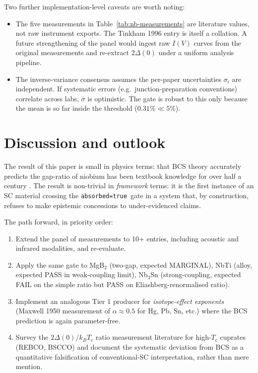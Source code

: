 \documentclass[11pt,a4paper]{article}
\newcommand{\absorbedtrue}{\textcolor{honestgreen}{\texttt{absorbed=true}}}
\begin{document}
Two further implementation-level caveats are worth noting:

\begin{itemize}\itemsep0.3em
\item The five measurements in Table~\ref{tab:nb-measurements} are
  literature values, not raw instrument exports. The Tinkham 1996
  entry is itself a collation. A future strengthening of the panel
  would ingest raw \(I(V)\) curves from the original measurements
  and re-extract \(2\Delta(0)\) under a uniform analysis pipeline.
\item The inverse-variance consensus assumes the per-paper
  uncertainties \(\sigma_{i}\) are independent. If systematic errors
  (e.g.\ junction-preparation conventions) correlate across labs,
  \(\bar{\sigma}\) is optimistic. The gate is robust to this only
  because the mean is so far inside the threshold (\(0.31\% \ll 5\%\)).
\end{itemize}

\section{Discussion and outlook}
\label{sec:discussion}

The result of this paper is small in physics terms: that BCS
theory accurately predicts the gap-ratio of niobium has been
textbook knowledge for over half a century \cite{tinkham1996}.
The result is non-trivial in \emph{framework} terms: it is the
first instance of an SC material crossing the \absorbedtrue\ gate in
a system that, by construction, refuses to make epistemic concessions
to under-evidenced claims.

The path forward, in priority order:

\begin{enumerate}\itemsep0.3em
\item Extend the panel of measurements to 10+ entries, including
  acoustic and infrared modalities, and re-evaluate.
\item Apply the same gate to MgB$_2$ (two-gap, expected MARGINAL),
  NbTi (alloy, expected PASS in weak-coupling limit), Nb$_{3}$Sn
  (strong-coupling, expected FAIL on the simple ratio but PASS on
  Eliashberg-renormalised ratio).
\item Implement an analogous Tier 1 producer for \emph{isotope-effect
  exponents} (Maxwell 1950 measurement of \(\alpha \approx 0.5\) for Hg, Pb,
  Sn, etc.) where the BCS prediction is again parameter-free.
\item Survey the \(2\Delta(0)/k_{B}T_{c}\) ratio measurement
  literature for high-$T_{c}$ cuprates (REBCO, BSCCO) and document
  the systematic deviation from BCS as a quantitative falsification
  of conventional-SC interpretation, rather than mere mention.
\end{enumerate}
\end{document}
